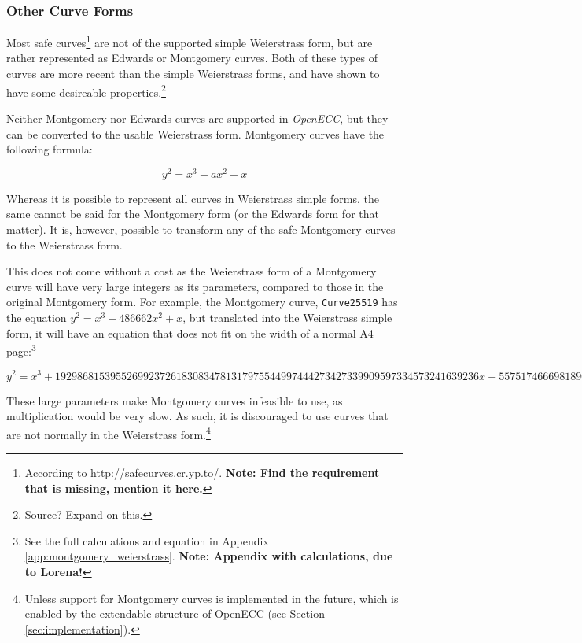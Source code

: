 \subsubsection{Other Curve Forms}

Most safe curves\footnote{According to http://safecurves.cr.yp.to/. \textbf{Note: Find the requirement
that is missing, mention it here.}} are not of the supported simple
Weierstrass form, but are rather represented as Edwards or Montgomery curves. Both of
these types of curves are more recent than the simple Weierstrass forms, and have shown to have some
desireable properties.\footnote{Source? Expand on this.}

Neither Montgomery nor Edwards curves are supported in \emph{OpenECC}, but they can be converted to the
usable Weierstrass form. Montgomery curves have the following formula:

\begin{equation}
	y^2 = x^3 + ax^2 + x
\end{equation}

Whereas it is possible to represent all curves in Weierstrass simple forms, the same cannot be said for
the Montgomery form (or the Edwards form for that matter). It is, however, possible to
transform any of the safe Montgomery curves to the Weierstrass form.\cite{safecurves}

This does not come without a cost as the Weierstrass form of a Montgomery curve will have
very large integers as its parameters, compared to those in the original Montgomery form. For example,
the Montgomery curve, \verb|Curve25519| has the equation \(y^2 = x^3+486662x^2+x\), but
translated into the Weierstrass simple form, it will have an equation that does not fit on the width of
a normal A4 page:\footnote{See the full calculations and equation in Appendix \ref{app:montgomery_weierstrass}.
\textbf{Note: Appendix with calculations, due to Lorena!}}

\begin{equation}
	y^2 =
	x^3 +
	19298681539552699237261830834781317975544997444273427339909597334573241639236x +
	55751746669818908907645289078257140818241103727901012315294400837956729358436
\end{equation}

These large parameters make Montgomery curves infeasible to use, as multiplication would be very slow. As such,
it is discouraged to use curves that are not normally in the Weierstrass form.\footnote{Unless support for Montgomery
curves is implemented in the future, which is enabled by the extendable structure of OpenECC (see Section \ref{sec:implementation}).}